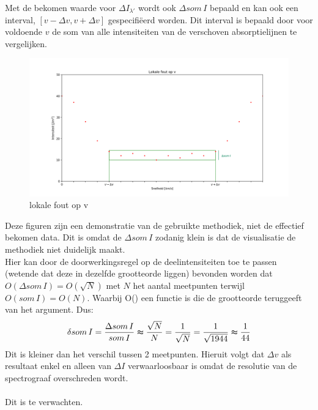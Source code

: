 \documentclass[12pt]{article}
\begin{document}
\noindent
Met de bekomen waarde voor $\Delta I_{\lambda '} $ wordt ook $\Delta som\,I$ bepaald en kan ook een interval, $[v-\Delta v, v+ \Delta v]$ gespecifiëerd worden. Dit interval is bepaald door voor voldoende $v$ de som van alle intensiteiten van de verschoven absorptielijnen te vergelijken.
\begin{center}
	\begin{minipage}{1\textwidth}
		\begin{figure}[H]
			\centering
			\includegraphics[width=1\textwidth]{lokale_fout_op_v.png}
			\caption{\label{fig 7: lokale fout op v} lokale fout op v}
		\end{figure}
	\end{minipage}
\end{center}
Deze figuren zijn een demonstratie van de gebruikte methodiek, niet de effectief bekomen data. Dit is omdat de $\Delta som\, I$ zodanig klein is dat de visualisatie de methodiek niet duidelijk maakt.\\
Hier kan door de doorwerkingsregel op de deelintensiteiten toe te passen (wetende dat deze in dezelfde grootteorde liggen) bevonden worden dat $O(\Delta som\, I) = O(\sqrt{N})$ met $N$ het aantal meetpunten terwijl $O(som\, I) = O(N)$. Waarbij O() een functie is die de grootteorde teruggeeft van het argument. Dus:
\begin{equation}
	\delta som\, I = \frac{\Delta som\, I}{ som\, I} \thickapprox \frac{\sqrt{N}}{N} = \frac{1}{\sqrt{N}} = \frac{1}{\sqrt{1944}} \thickapprox \frac{1}{44}
\end{equation}
Dit is kleiner dan het verschil tussen 2 meetpunten. Hieruit volgt dat $\Delta v$ als resultaat enkel en alleen van $\Delta I$ verwaarloosbaar is omdat de resolutie van de spectrograaf overschreden wordt.\\\\ 
Dit is te verwachten.
\end{document}

